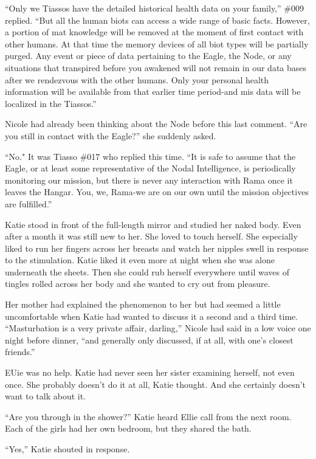\documentclass[]{article}
\begin{document}
{“Only we Tiassos have the detailed historical health data on your family,” \#009 replied.  “But all the human biots can access a wide range of basic facts.  However, a portion of mat knowledge will be removed at the moment of first contact with other humans.  At that time the memory devices of all biot types will be partially purged.  Any event or piece of data pertaining to the Eagle, the Node, or any situations that transpired before you awakened will not remain in our data bases after we rendezvous with the other humans.  Only your personal health information will be available from that earlier time period-and mis data will be localized in the Tiassos.”

Nicole had already been thinking about the Node before this last comment.  “Are you still in contact with the Eagle?” she suddenly asked.

“No."  It was Tiasso \#017 who replied this time.  “It is safe to assume that the Eagle, or at least some representative of the Nodal Intelligence, is periodically monitoring our mission, but there is never any interaction with Rama once it leaves the Hangar.  You, we, Rama-we are on our own until the mission objectives are fulfilled.”

Katie stood in front of the full-length mirror and studied her naked body.  Even after a month it was still new to her.  She loved to touch herself.  She especially liked to run her fingers across her breasts and watch her nipples swell in response to the stimulation.  Katie liked it even more at night when she was alone underneath the sheets.  Then she could rub herself everywhere until waves of tingles rolled across her body and she wanted to cry out from pleasure.

Her mother had explained the phenomenon to her but had seemed a little uncomfortable when Katie had wanted to discuss it a second and a third time.  “Masturbation is a very private affair, darling,” Nicole had said in a low voice one night before dinner, “and generally only discussed, if at all, with one’s closest friends.”

EUie was no help.  Katie had never seen her sister examining herself, not even once.  She probably doesn’t do it at all, Katie thought.  And she certainly doesn’t want to talk about it.

“Are you through in the shower?” Katie heard Ellie call from the next room.  Each of the girls had her own bedroom, but they shared the bath.

“Yes,” Katie shouted in response.

}
\end{document}
